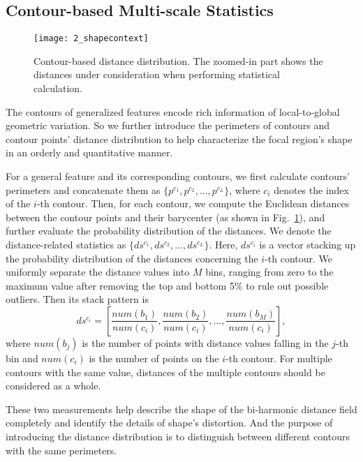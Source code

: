 \subsection{Contour-based Multi-scale Statistics}

\begin{figure}[!to]
\begin{center}
\texttt{[image: 2\_shapecontext]}
\end{center}
\caption{Contour-based distance distribution. The zoomed-in part shows
  the distances under consideration when performing
  statistical calculation.}
\label{Descriptor}
\end{figure}

The contours of generalized features encode rich
  information of local-to-global geometric variation. So we further
introduce the perimeters of contours and contour points' distance
distribution to help characterize the focal region's shape in an
orderly and quantitative manner.

For a general feature and its corresponding contours,
we first calculate contours' perimeters and concatenate them as $\{
p^{c_1},p^{c_2},...,p^{c_L} \}$, where $c_i$ denotes the index of
the $i$-th contour. Then, for each contour, we compute the Euclidean
distances between the contour points and their barycenter (as shown
in Fig.~\ref{Descriptor}), and further evaluate the probability
distribution of the distances. We denote the distance-related
statistics as $\{ds^{c_1},ds^{c_2},...,ds^{c_L} \}$. Here, $ds^{c_i}$
is a vector stacking up the probability distribution of the distances
concerning the $i$-th contour. We uniformly separate the distance
values into $M$ bins, ranging from zero to the maximum value after
removing the top and bottom 5\% to rule out possible outliers. Then
its stack pattern is
\begin{equation}
  ds^{c_i}=[\frac{num(b_1)}{num(c_i)},\frac{num(b_2)}{num(c_i)},...,\frac{num(b_M)}{num(c_i)}],
\end{equation}
where $num(b_j)$ is the number of points with distance values falling
in the $j$-th bin and $num(c_i)$ is the number of points on the $i$-th
contour. For multiple contours with the same value, distances of
the multiple contours should be considered as a whole.

These two measurements help describe the shape of the bi-harmonic distance
field completely and identify the details of shape's distortion.
And the purpose of introducing the distance distribution
is to distinguish between different contours with the same perimeters.


